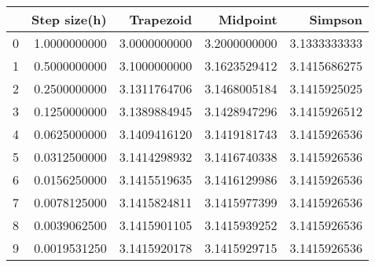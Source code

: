 \begin{tabular}{|l|r|r|r|r|}
\hline
{} &  Step size(h) &    Trapezoid &     Midpoint &      Simpson \\
\hline
0 &  1.0000000000 & 3.0000000000 & 3.2000000000 & 3.1333333333 \\
1 &  0.5000000000 & 3.1000000000 & 3.1623529412 & 3.1415686275 \\
2 &  0.2500000000 & 3.1311764706 & 3.1468005184 & 3.1415925025 \\
3 &  0.1250000000 & 3.1389884945 & 3.1428947296 & 3.1415926512 \\
4 &  0.0625000000 & 3.1409416120 & 3.1419181743 & 3.1415926536 \\
5 &  0.0312500000 & 3.1414298932 & 3.1416740338 & 3.1415926536 \\
6 &  0.0156250000 & 3.1415519635 & 3.1416129986 & 3.1415926536 \\
7 &  0.0078125000 & 3.1415824811 & 3.1415977399 & 3.1415926536 \\
8 &  0.0039062500 & 3.1415901105 & 3.1415939252 & 3.1415926536 \\
9 &  0.0019531250 & 3.1415920178 & 3.1415929715 & 3.1415926536 \\
\hline
\end{tabular}